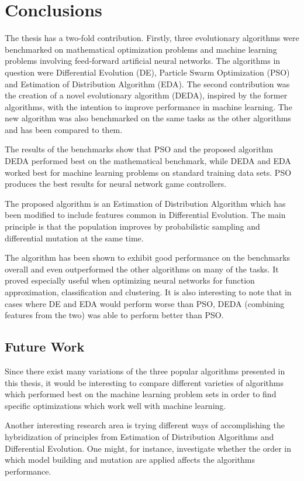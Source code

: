 \section{Conclusions}

The thesis has a two-fold contribution. Firstly, three evolutionary algorithms were benchmarked on mathematical optimization problems and machine learning problems involving feed-forward artificial neural networks. The algorithms in question were Differential Evolution (DE), Particle Swarm Optimization (PSO) and Estimation of Distribution Algorithm (EDA). The second contribution was the creation of a novel evolutionary algorithm (DEDA), inspired by the former algorithms, with the intention to improve performance in machine learning. The new algorithm was also benchmarked on the same tasks as the other algorithms and has been compared to them.

The results of the benchmarks show that PSO and the proposed algorithm DEDA performed best on the mathematical benchmark, while DEDA and EDA worked best for machine learning problems on standard training data sets. PSO produces the best results for neural network game controllers.

The proposed algorithm is an Estimation of Distribution Algorithm which has been modified to include features common in Differential Evolution. The main principle is that the population improves by probabilistic sampling and differential mutation at the same time.

The algorithm has been shown to exhibit good performance on the benchmarks overall and even outperformed the other algorithms on many of the tasks. It proved especially useful when optimizing neural networks for function approximation, classification and clustering. It is also interesting to note that in cases where DE and EDA would perform worse than PSO, DEDA (combining features from the two) was able to perform better than PSO.

\subsection{Future Work}

Since there exist many variations of the three popular algorithms presented in this thesis, it would be interesting to compare different varieties of algorithms which performed best on the machine learning problem sets in order to find specific optimizations which work well with machine learning.

Another interesting research area is trying different ways of accomplishing the hybridization of principles from Estimation of Distribution Algorithms and Differential Evolution. One might, for instance, investigate whether the order in which model building and mutation are applied affects the algorithms performance.

